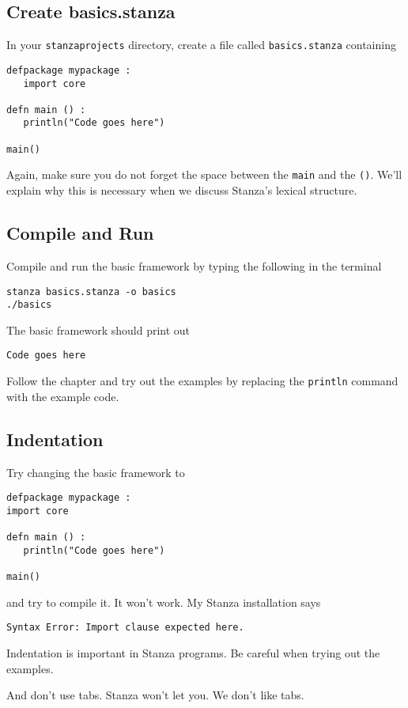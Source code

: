 \documentclass[10pt,oneside]{book}
\begin{document}
\subsection*{Create basics.stanza}
In your \texttt{\frenchspacing stanzaprojects} directory, create a file called \texttt{\frenchspacing basics.stanza} containing
\begin{lstlisting}
defpackage mypackage :
   import core

defn main () :
   println("Code goes here")

main()
\end{lstlisting}
Again, make sure you do not forget the space between the \texttt{\frenchspacing main} and the \texttt{\frenchspacing ()}. We'll explain why this is necessary when we discuss Stanza's lexical structure.

\subsection*{Compile and Run}
Compile and run the basic framework by typing the following in the terminal
\begin{lstlisting}
stanza basics.stanza -o basics
./basics
\end{lstlisting}

The basic framework should print out
\begin{lstlisting}
Code goes here
\end{lstlisting}

Follow the chapter and try out the examples by replacing the \texttt{\frenchspacing println} command with the example code.

\subsection*{Indentation}
Try changing the basic framework to
\begin{lstlisting}
defpackage mypackage :
import core

defn main () :
   println("Code goes here")

main()
\end{lstlisting}
and try to compile it. It won't work. My Stanza installation says
\begin{lstlisting}
Syntax Error: Import clause expected here.
\end{lstlisting}

Indentation is important in Stanza programs. Be careful when trying out the examples. 

And don't use tabs. Stanza won't let you. We don't like tabs.
\end{document}
